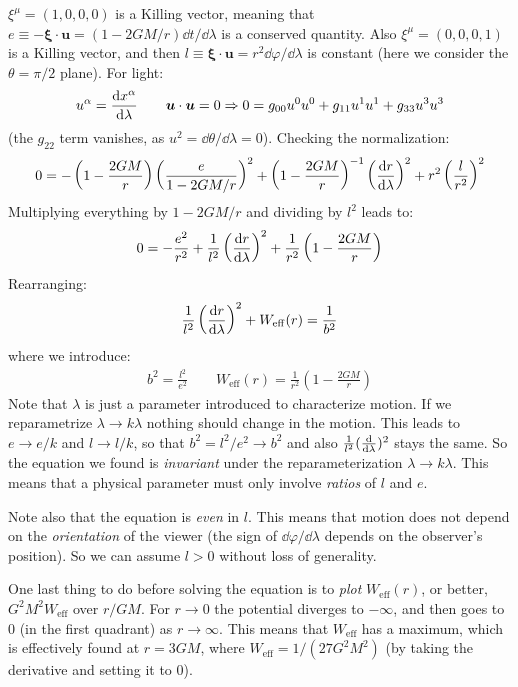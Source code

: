 \documentclass[../template.tex]{subfiles}
\begin{document}
$\xi^\mu = (1,0,0,0)$ is a Killing vector, meaning that $e\equiv -\bm{\xi}\cdot \bm{u} = (1- 2GM/r) \dd{t}/\dd{\lambda}$ is a conserved quantity. Also $\xi^\mu = (0,0,0,1)$ is a Killing vector, and then $l \equiv \bm{\xi} \cdot \bm{u} = r^2 \dd{\varphi}/\dd{\lambda}$ is constant (here we consider the $\theta = \pi/2$ plane). For light:
\begin{align*}
    u^\alpha = \dv{x^\alpha}{\lambda} \qquad \bm{u}\cdot \bm{u} = 0 \Rightarrow 0 = g_{00} u^0 u^0 + g_{11} u^1 u^1 + g_{33} u^3 u^3
\end{align*}   
(the $g_{22} $ term vanishes, as $u^2 = \dd{\theta}/\dd{\lambda} = 0$). Checking the normalization:
\begin{align*}
    0 = -\left(1-\frac{2GM}{r} \right)\left(\frac{e}{1-2GM/r} \right)^2 + \left(1-\frac{2GM}{r} \right)^{-1} \left(\dv{r}{\lambda}\right)^2 + r^2 \left(\frac{l}{r^2} \right)^2
\end{align*}
Multiplying everything by $1-2GM/r$ and dividing by $l^2$  leads to:
\begin{align*}
    0 = -\frac{e^2}{r^2} + \frac{1}{l^2} \left(\dv{r}{\lambda}\right)^2 + \frac{1}{r^2} \left(1-\frac{2GM}{r} \right)   
\end{align*} 
Rearranging:
\begin{align*}
    \frac{1}{l^2} \left(\dv{r}{\lambda}\right)^2 + W_{\mathrm{eff} }(r) = \frac{1}{b^2}  
\end{align*}
where we introduce:
\begin{align*}
    b^2 = \frac{l^2}{e^2} \qquad W_{\mathrm{eff} }(r) = \frac{1}{r^2}\left(1-\frac{2GM}{r} \right)  
\end{align*}
Note that $\lambda$ is just a parameter introduced  to characterize motion. If we reparametrize $\lambda \to k \lambda$ nothing should change in the motion. This leads to $e \to e/k$ and $l \to l/k$, so that $b^2 = l^2/e^2 \to b^2 $ and also $\frac{1}{l^2} (\dv{\lambda})^2$ stays the same. So the equation we found is \textit{invariant} under the reparameterization $\lambda \to k \lambda$. This means that a physical parameter must only involve \textit{ratios} of $l$ and $e$.

Note also that the equation is \textit{even} in $l$. This means that motion does not depend on the \textit{orientation} of the viewer (the sign of $\dd{\varphi}/\dd{\lambda}$ depends on the observer's position). So we can assume $l>0$ without loss of generality.

One last thing to do before solving the equation is to \textit{plot} $W_{\mathrm{eff} }(r)$, or better, $G^2M^2 W_{\mathrm{eff} }$ over $r/GM$. For $r \to 0$ the potential diverges to $-\infty$, and then goes to $0$ (in the first quadrant) as $r \to \infty$. This means that $W_{\mathrm{eff} }$ has a maximum, which is effectively found at $r= 3GM$, where $W_{\mathrm{eff} } = 1/(27 G^2 M^2)$ (by taking the derivative and setting it to $0$).
\end{document}
